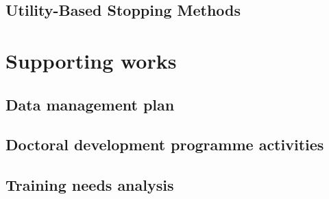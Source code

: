 \documentclass[10pt,oneside]{book}
\begin{document}
\section{Utility-Based Stopping Methods}

\label{app:Utility_Based_Stopping_Methods}

\chapter{Supporting works}
\section{Data management plan}\label{app:dmp}


\section{Doctoral development programme activities}\label{app:ddp}



\section{Training needs analysis}\label{app:tna}

\end{document}
